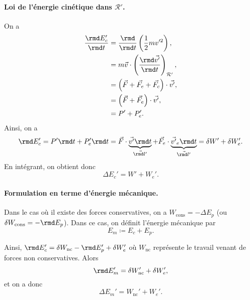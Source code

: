             \paragraph{Loi de l'énergie cinétique dans $\mathcal{R}'$.}
                On a 
                \begin{align*}
                    \frac{\rmd E_{c}'}{\rmd t} 
                    &= \frac{\rmd}{\rmd t}\left(\frac{1}{2}m v'^{2}\right),\\
                    &= m\vec{v}\cdot\left(\frac{\rmd\vec{v'}}{\rmd t}\right)_{\mathcal{R}'},\\
                    &=\left(\vec{F}+\vec{F_e}+\vec{F_c}\right)\cdot\vec{v'},\\
                    &=\left(\vec{F}+\vec{F_e}\right)\cdot\vec{v'},\\
                    &=P' + P_e'.
                \end{align*}
                Ainsi, on a 
                \begin{equation*}
                    \rmd E_c'=P'\rmd t+P_e'\rmd t=\vec{F}\cdot\underbrace{\vec{v'}\rmd t}_{\vec{\rmd l'}}+\vec{F_e}\cdot\underbrace{\vec{v'}_e\rmd t}_{\vec{\rmd l'}}=\delta W'+\delta W_e'.
                \end{equation*}
                En intégrant, on obtient donc
                \begin{equation*}
                    \boxed{\Delta E_c'=W'+W_e'.}    
                \end{equation*}
            
            \paragraph{Formulation en terme d'énergie mécanique.} Dans le cas où il existe des forces conservatives, on a $W_{\text{cons}}=-\Delta E_p$ (ou $\delta W_{\text{cons}}=-\rmd E_p$). Dans ce cas, on définit l'énergie mécanique par
            \begin{equation*}
                \boxed{E_m\coloneqq E_c+E_p.}
            \end{equation*}

            Ainsi, $\rmd E_c'=\delta W_{\text{nc}}-\rmd E_p'+\delta W_e'$ où $W_{\text{nc}}$ représente le travail venant de forces non conservatives. Alors 
            \begin{equation*}
                \rmd E_m'=\delta W_{\text{nc}}'+\delta W_{e}',
            \end{equation*}
            et on a donc
            \begin{equation*}
                \boxed{\Delta E_m'=W_{\text{nc}}'+W_e'.}
            \end{equation*}
        
